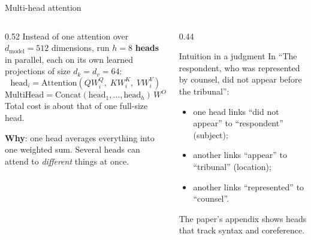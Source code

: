 \documentclass[aspectratio=169,11pt]{beamer}
\begin{document}
\begin{frame}{Multi-head attention}
  \begin{columns}[T]
    \begin{column}{0.52\textwidth}
      \small
      Instead of one attention over $d_{\text{model}}=512$ dimensions, run $h=8$ \textbf{heads} in parallel, each on its own learned projections of size $d_k=d_v=64$:
      \[
        \text{head}_i=\text{Attention}(QW_i^Q,\;KW_i^K,\;VW_i^V)
      \]
      \[
        \text{MultiHead}=\text{Concat}(\text{head}_1,\ldots,\text{head}_h)\,W^O
      \]
      Total cost is about that of one full-size head.
      \vspace{1mm}

      \textbf{Why}: one head averages everything into one weighted sum. Several heads can attend to \emph{different} things at once.
    \end{column}
    \begin{column}{0.44\textwidth}
      \begin{exampleblock}{Intuition in a judgment}
        \small
        In ``The respondent, who was represented by counsel, did not appear before the tribunal'':
        \begin{itemize}
          \item one head links ``did not appear'' to ``respondent'' (subject);
          \item another links ``appear'' to ``tribunal'' (location);
          \item another links ``represented'' to ``counsel''.
        \end{itemize}
        The paper's appendix shows heads that track syntax and coreference.
      \end{exampleblock}
    \end{column}
  \end{columns}
\end{frame}
\end{document}
